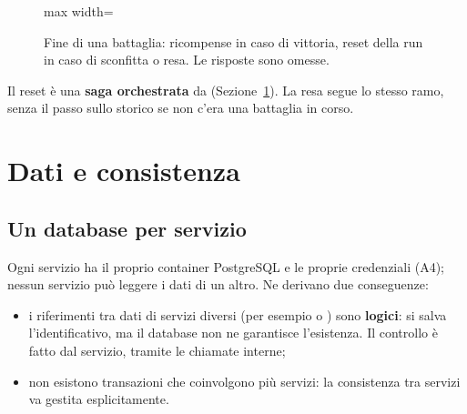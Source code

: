 \documentclass[11pt,a4paper]{article}
\newcommand{\lifeline}[3]{%
  \node[draw, fill=white, minimum width=2.1cm, minimum height=0.65cm,
        font=\sffamily\footnotesize, text depth=0.25ex] at (#1,0) {#2};
  \draw[gray, densely dashed] (#1,-0.33) -- (#1,#3);}
\newcommand{\msg}[4]{%
  \draw[arr] (#1,#3) -- node[above, font=\ttfamily\scriptsize, align=center,
        inner sep=1.5pt, fill=white]{#4} (#2,#3);}
\newcommand{\selfmsg}[3]{%
  \draw[arr] (#1,#2) -- ++(0.3,0) -- ++(0,-0.3) -- ++(-0.3,0);
  \node[anchor=west, font=\sffamily\scriptsize, align=left]
       at ($(#1,#2)+(0.35,-0.15)$) {#3};}
\newcommand{\frag}[6]{%
  \draw (#1,#2) rectangle (#3,#4);
  \node[draw, fill=white, anchor=north west, font=\sffamily\scriptsize\bfseries,
        inner sep=2pt] at (#1,#2) {#5};
  \node[anchor=north west, font=\sffamily\scriptsize] at ($(#1,#2)+(0.75,0)$) {[#6]};}
\newcommand{\fragsep}[4]{%
  \draw[dashed] (#1,#3) -- (#2,#3);
  \node[anchor=north west, font=\sffamily\scriptsize] at (#1,#3) {[#4]};}
\begin{document}
\begin{figure}[H]
  \centering
  \begin{adjustbox}{max width=\linewidth}
  \end{adjustbox}
  \caption{Fine di una battaglia: ricompense in caso di vittoria, reset della run in caso di sconfitta o resa. Le risposte sono omesse.}
  \label{fig:fine}
\end{figure}

Il reset è una \textbf{saga orchestrata} da  (Sezione~\ref{sec:dati}). La resa segue lo stesso ramo, senza il passo sullo storico se non c'era una battaglia in corso.

\section{Dati e consistenza}\label{sec:dati}

\subsection{Un database per servizio}

Ogni servizio ha il proprio container PostgreSQL e le proprie credenziali (A4); nessun servizio può leggere i dati di un altro. Ne derivano due conseguenze:
\begin{itemize}
  \item i riferimenti tra dati di servizi diversi (per esempio  o ) sono \textbf{logici}: si salva l'identificativo, ma il database non ne garantisce l'esistenza. Il controllo è fatto dal servizio, tramite le chiamate interne;
  \item non esistono transazioni che coinvolgono più servizi: la consistenza tra servizi va gestita esplicitamente.
\end{itemize}
\end{document}
